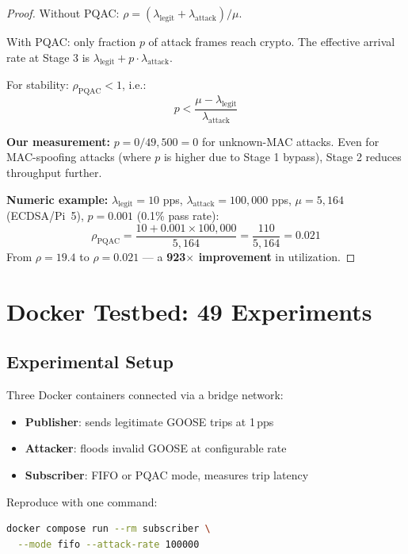 \documentclass[11pt,a4paper,twocolumn]{article}
\begin{document}
\begin{proof}
Without PQAC: $\rho = (\lambda_{\text{legit}} + \lambda_{\text{attack}}) / \mu$.

With PQAC: only fraction $p$ of attack frames reach crypto. The effective arrival rate at Stage 3 is $\lambda_{\text{legit}} + p \cdot \lambda_{\text{attack}}$.

For stability: $\rho_{\text{PQAC}} < 1$, i.e.:
\begin{equation}
p < \frac{\mu - \lambda_{\text{legit}}}{\lambda_{\text{attack}}}
\end{equation}

\textbf{Our measurement:} $p = 0/49{,}500 = 0$ for unknown-MAC attacks. Even for MAC-spoofing attacks (where $p$ is higher due to Stage 1 bypass), Stage 2 reduces throughput further.

\textbf{Numeric example:} $\lambda_{\text{legit}} = 10$ pps, $\lambda_{\text{attack}} = 100{,}000$ pps, $\mu = 5{,}164$ (ECDSA/Pi~5), $p = 0.001$ (0.1\% pass rate):
\begin{equation}
\rho_{\text{PQAC}} = \frac{10 + 0.001 \times 100{,}000}{5{,}164} = \frac{110}{5{,}164} = 0.021
\end{equation}
From $\rho = 19.4$ to $\rho = 0.021$ --- a \textbf{923$\times$ improvement} in utilization.
\end{proof}

\section{Docker Testbed: 49 Experiments}
\label{sec:experiments}

\subsection{Experimental Setup}

Three Docker containers connected via a bridge network:
\begin{itemize}[leftmargin=1.5em,itemsep=1pt]
\item \textbf{Publisher}: sends legitimate GOOSE trips at 1\,pps
\item \textbf{Attacker}: floods invalid GOOSE at configurable rate
\item \textbf{Subscriber}: FIFO or PQAC mode, measures trip latency
\end{itemize}

Reproduce with one command:
\begin{lstlisting}[language=bash]
docker compose run --rm subscriber \
  --mode fifo --attack-rate 100000
\end{lstlisting}
\end{document}
